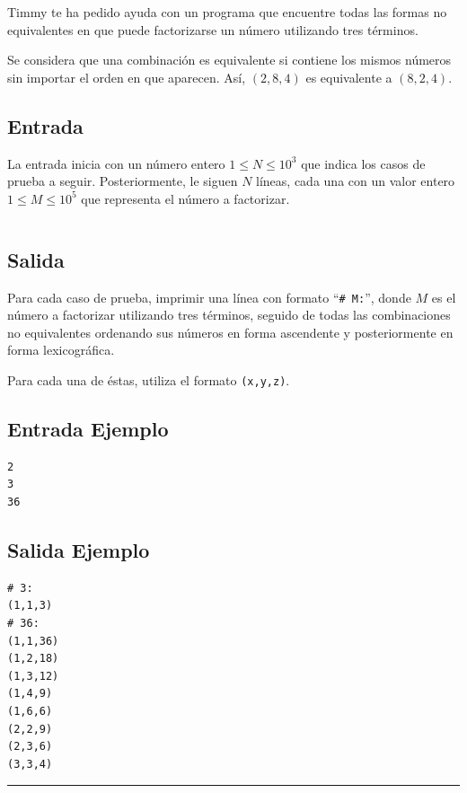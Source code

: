 Timmy te ha pedido ayuda con un programa que encuentre todas las formas no equivalentes en que puede factorizarse un número utilizando tres términos.

Se considera que una combinación es equivalente si contiene los mismos números sin importar el orden en que aparecen. Así, $(2,8,4)$ es equivalente a $(8,2,4)$.

\subsection*{Entrada}

La entrada inicia con un número entero $1 \leq N \leq 10^3$ que indica los casos de prueba a seguir. Posteriormente, le siguen $N$ líneas, cada una con un valor entero $1 \leq M \leq 10^5$ que representa el número a factorizar.

\newpage
$$
$$
$$
$$

\subsection*{Salida}
Para cada caso de prueba, imprimir una línea con formato “\texttt{\# M:}”, donde $M$ es el número a factorizar utilizando tres términos, seguido de todas las combinaciones no equivalentes ordenando sus números en forma ascendente y posteriormente en forma lexicográfica.

Para cada una de éstas, utiliza el formato \texttt{(x,y,z)}. 

\subsection*{Entrada Ejemplo}
\begin{verbatim}
2 
3
36
\end{verbatim}


\subsection*{Salida Ejemplo}

\begin{verbatim}
# 3:
(1,1,3)
# 36:
(1,1,36)
(1,2,18)
(1,3,12)
(1,4,9)
(1,6,6)
(2,2,9)
(2,3,6)
(3,3,4)
\end{verbatim}

\noindent \rule[0.5ex]{1\columnwidth}{1pt}


